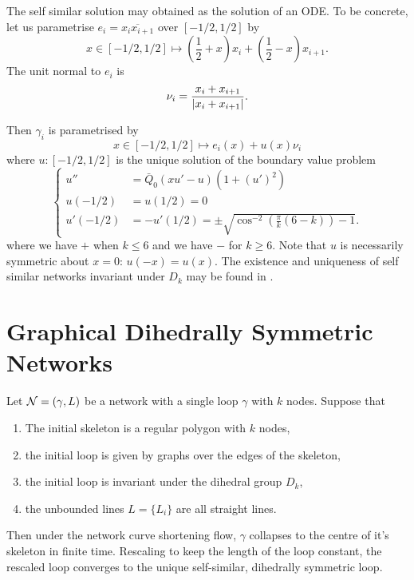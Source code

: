 \documentclass[12pt]{amsart}
\begin{document}
The self similar solution may obtained as the solution of an ODE. To be concrete, let us parametrise \(e_i = \overline{x_i x_{i+1}}\) over \([-1/2, 1/2]\) by
\[
x \in [-1/2, 1/2] \mapsto \left(\frac{1}{2} + x\right) x_i + \left(\frac{1}{2} - x\right) x_{i+1}.
\]
The unit normal to \(e_i\) is
\[
\nu_i = \frac{x_i + x_{i+1}}{\left|x_i + x_{i+1}\right|}.
\]

Then \(\gamma_i\) is parametrised by
\[
x \in [-1/2, 1/2] \mapsto e_i(x) + u(x) \nu_i
\]
where \(u : [-1/2, 1/2]\) is the unique solution of the boundary value problem
\begin{equation}
\label{eq:self_similar_graph}
\begin{cases}
u'' &= \bar{Q}_0 (xu' - u)(1 + (u')^2) \\
u(-1/2) &= u(1/2) = 0 \\
u'(-1/2) &= -u'(1/2) = \pm \sqrt{\cos^{-2} \left(\frac{\pi}{k}(6 - k)\right) - 1}.
\end{cases}
\end{equation}
where we have \(+\) when \(k \leq 6\) and we have \(-\) for \(k \geq 6\). Note that \(u\) is necessarily symmetric about \(x = 0\): \(u(-x) = u(x)\). The existence and uniqueness of self similar networks invariant under \(D_k\) may be found in \cite{MR2340176}.

\section{Graphical Dihedrally Symmetric Networks}

\begin{theorem}
\label{thm:dihedral_graphs}

Let \(\operatorname{\mathcal{N}} = (\gamma, L)\) be a network with a single loop \(\gamma\) with \(k\) nodes. Suppose that
\begin{enumerate}
\item The initial skeleton is a regular polygon with \(k\) nodes,
\item the initial loop is given by graphs over the edges of the skeleton,
\item the initial loop is invariant under the dihedral group \(D_k\),
\item the unbounded lines \(L = \{L_i\}\) are all straight lines.
\end{enumerate}

Then under the network curve shortening flow, \(\gamma\) collapses to the centre of it's skeleton in finite time. Rescaling to keep the length of the loop constant, the rescaled loop converges to the unique self-similar, dihedrally symmetric loop.
\end{theorem}
\end{document}
